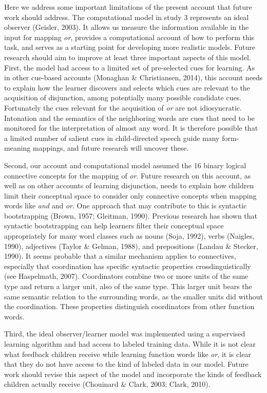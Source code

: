\documentclass[
  english,
  ,man,floatsintext]{apa6}
\begin{document}
Here we address some important limitations of the present account that future work should address. The computational model in study 3 represents an ideal observer (Geisler, 2003). It allows us measure the information available in the input for mapping \emph{or}, provides a computational account of how to perform this task, and serves as a starting point for developing more realistic models. Future research should aim to improve at least three important aspects of this model. First, the model had access to a limited set of pre-selected cues for learning. As in other cue-based accounts (Monaghan \& Christiansen, 2014), this account needs to explain how the learner discovers and selects which cues are relevant to the acquisition of disjunction, among potentially many possible candidate cues. Fortunately the cues relevant for the acquisition of \emph{or} are not idiosyncratic. Intonation and the semantics of the neighboring words are cues that need to be monitored for the interpretation of almost any word. It is therefore possible that a limited number of salient cues in child-directed speech guide many form-meaning mappings, and future research will uncover these.

Second, our account and computational model assumed the 16 binary logical connective concepts for the mapping of \emph{or}. Future research on this account, as well as on other accounts of learning disjunction, needs to explain how children limit their conceptual space to consider only connective concepts when mapping words like \emph{and} and \emph{or}. One approach that may contribute to this is syntactic bootstrapping (Brown, 1957; Gleitman, 1990). Previous research has shown that syntactic bootstrapping can help learners filter their conceptual space appropriately for many word classes such as nouns (Soja, 1992), verbs (Naigles, 1990), adjectives (Taylor \& Gelman, 1988), and prepositions (Landau \& Stecker, 1990). It seems probable that a similar mechanism applies to connectives, especially that coordination has specific syntactic properties crosslinguistically (see Haspelmath, 2007). Coordinators combine two or more units of the same type and return a larger unit, also of the same type. This larger unit bears the same semantic relation to the surrounding words, as the smaller units did without the coordination. These properties distinguish coordinators from other function words.

Third, the ideal observer/learner model was implemented using a supervised learning algorithm and had access to labeled training data. While it is not clear what feedback children receive while learning function words like \emph{or}, it is clear that they do not have access to the kind of labeled data in our model. Future work should revise this aspect of the model and incorporate the kinds of feedback children actually receive (Chouinard \& Clark, 2003; Clark, 2010).
\end{document}
